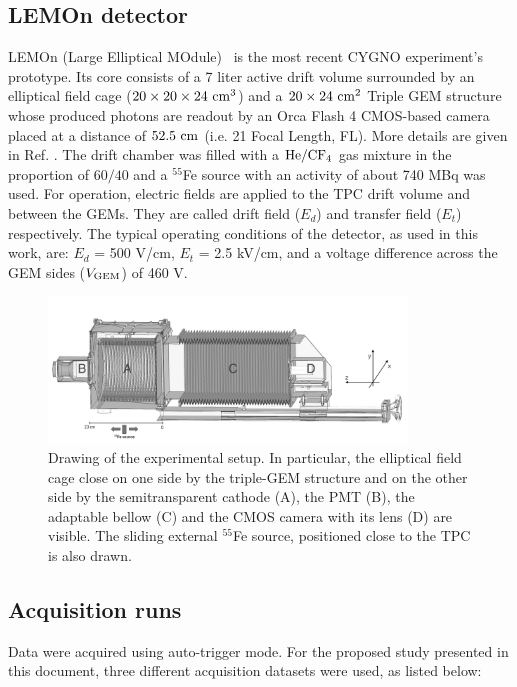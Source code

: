\documentclass[a4paper,11pt]{article}
\begin{document}
\subsection{LEMOn detector}

LEMOn (Large Elliptical MOdule)~\cite{bib:ieee17} is the most recent CYGNO experiment's prototype. Its core consists of a 7 liter active drift volume surrounded by an elliptical field cage ($\rm 20 \times 20 \times 24~cm^3$) and a $\rm 20 \times 24~cm^2$ Triple GEM structure whose produced photons are readout by an Orca Flash 4 CMOS-based camera~\cite{ORCAcamera} placed at a distance of $\rm 52.5~cm$ (i.e. 21 Focal Length, FL).
More details are given in Ref. \cite{bib:fe55, bib:eps}.
The drift chamber was filled with a $\rm He/CF_4$ gas mixture in the proportion of $60/40$ and a $^{55}$Fe source with an activity of about 740 MBq was used.
For operation, electric fields are applied to the TPC drift volume and between the GEMs. They are called drift field ($E_d$) and transfer field ($E_t$) respectively.
The typical operating conditions of the detector, as used in this work, are: $E_d$ = 500 V/cm, $E_t$ = 2.5 kV/cm, and a voltage difference across the GEM sides ($ V\rm_{GEM}$) of 460 V.


\begin{figure}[ht]
\centering
\includegraphics[width=0.85\textwidth]{sex_bw3.png}
\caption{Drawing of the experimental setup. In particular, the elliptical field cage close on one side by the triple-GEM structure and on the other side by the semitransparent cathode (A), the PMT (B), the adaptable bellow (C) and the CMOS camera with its lens (D) are visible. The sliding external $^{55}$Fe source, positioned close to the TPC is also drawn.} \label{fig_lemon_1}
\end{figure}

\subsection{Acquisition runs}
\label{sec:acrRuns}

Data were acquired using auto-trigger mode. For the proposed study presented in this document, three different acquisition datasets were used, as listed below:
\end{document}
